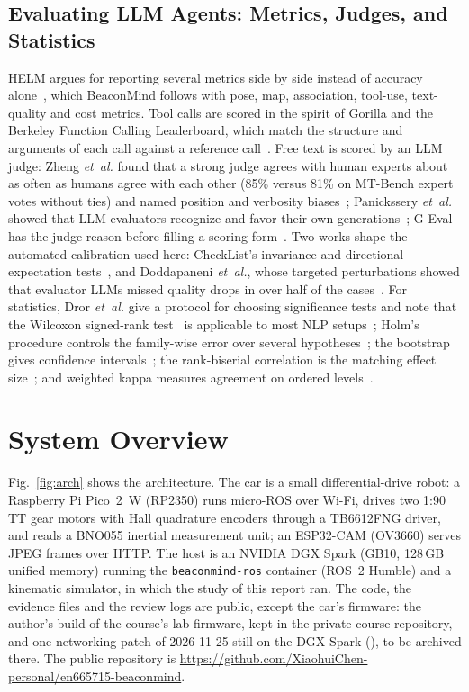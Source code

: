 \documentclass[conference]{IEEEtran}
\begin{document}
\subsection{Evaluating LLM Agents: Metrics, Judges, and Statistics}
HELM argues for reporting several metrics side by side instead of accuracy alone~\cite{liang2023holistic}, which
BeaconMind follows with pose, map, association, tool-use, text-quality and cost metrics. Tool calls are scored in
the spirit of Gorilla and the Berkeley Function Calling Leaderboard, which match the structure and arguments of
each call against a reference call~\cite{patil2024gorilla,patil2025bfcl}. Free text is scored by an
LLM judge: Zheng \textit{et~al.} found that a strong judge agrees with human experts about as often as humans
agree with each other (85\% versus 81\% on MT-Bench expert votes without ties) and named position and verbosity
biases~\cite{zheng2023judging};
Panickssery \textit{et~al.} showed that LLM evaluators recognize and favor their own
generations~\cite{panickssery2024llm}; G-Eval has the judge reason before filling a scoring
form~\cite{liu2023geval}. Two works shape the automated calibration used here: CheckList's invariance and
directional-expectation tests~\cite{ribeiro2020beyond}, and Doddapaneni \textit{et~al.}, whose targeted
perturbations showed that evaluator LLMs missed quality drops in over half of the cases~\cite{doddapaneni2024finding}.
For statistics, Dror \textit{et~al.} give a protocol for choosing significance tests and note that the
Wilcoxon signed-rank test~\cite{wilcoxon1945individual} is applicable to most NLP setups~\cite{dror2018hitchhikers}; Holm's
procedure controls the family-wise error over several hypotheses~\cite{holm1979simple}; the bootstrap gives
confidence intervals~\cite{efron1993introduction}; the rank-biserial correlation is the matching effect
size~\cite{kerby2014simple}; and weighted kappa measures agreement on ordered levels~\cite{cohen1968weighted}.


\section{System Overview}\label{sec:system}
Fig.~\ref{fig:arch} shows the architecture. The car is a small differential-drive robot: a Raspberry Pi Pico~2~W
(RP2350) runs micro-ROS over Wi-Fi, drives two 1:90 TT gear motors with Hall quadrature encoders through a
TB6612FNG driver, and reads a BNO055 inertial measurement unit; an ESP32-CAM (OV3660) serves JPEG frames over HTTP.
The host is an NVIDIA DGX Spark (GB10, 128\,GB unified memory) running the \texttt{beaconmind-ros} container
(ROS~2 Humble) and a kinematic simulator, in which the study of this report ran. The code, the evidence files
and the review logs are public, except the car's firmware: the author's build of the course's lab firmware, kept in
the private course repository, and one networking patch of 2026-11-25 still on the DGX Spark
(), to be archived there. The public repository is
\url{https://github.com/XiaohuiChen-personal/en665715-beaconmind}.
\end{document}
